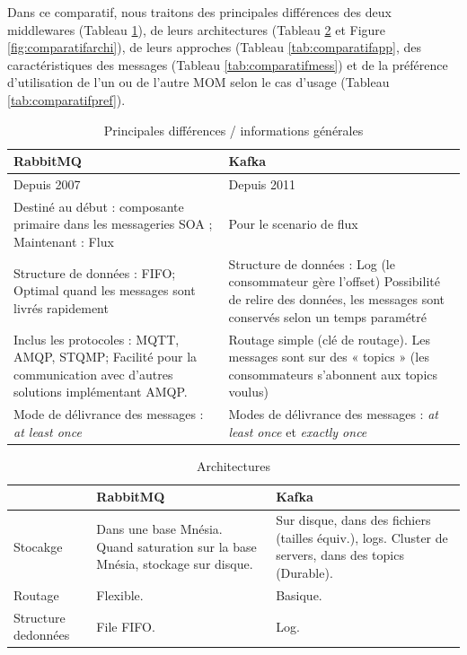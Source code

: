 \documentclass{article}
\begin{document}
			Dans ce comparatif, nous traitons des principales différences des deux middlewares (Tableau \ref{tab:comparatifinfos}), de leurs architectures (Tableau \ref{tab:comparatifarchi} et Figure \ref{fig:comparatifarchi}), de leurs approches (Tableau \ref{tab:comparatifapp}, des caractéristiques des messages (Tableau \ref{tab:comparatifmess}) et de la préférence d'utilisation de l'un ou de l'autre MOM selon le cas d'usage (Tableau \ref{tab:comparatifpref}).
			\begin{table}[p]
				\begin{tabular}{|p{7.5cm}|p{7.5cm}|}
					\hline
					\rowcolor{lightgray} RabbitMQ & Kafka\\\hline
					Depuis 2007 & Depuis 2011\\\hline
					Destiné au début : composante primaire dans les messageries SOA ; Maintenant : Flux & Pour le scenario de flux\\\hline
					Structure de données : FIFO; Optimal quand les messages sont livrés rapidement & Structure de données : Log (le consommateur gère l’offset) Possibilité de relire des données, les messages sont conservés selon un temps paramétré\\\hline
					Inclus les protocoles : MQTT, AMQP, STQMP; Facilité pour la communication avec d’autres solutions implémentant AMQP. & Routage simple (clé de routage). Les messages sont sur des « topics » (les consommateurs s’abonnent aux topics voulus)\\\hline
					Mode de délivrance des messages : \textit{at least once} & Modes de délivrance des messages : \textit{at least once} et \textit{exactly once}\\\hline
				\end{tabular}
				\caption{Principales différences / informations générales}
				\label{tab:comparatifinfos}
			\end{table}
			\medskip
			\begin{table}[p]
				\begin{tabular}{|p{3cm}|p{6cm}|p{6cm}|}
					\hline
					\rowcolor{lightgray} & RabbitMQ & Kafka\\\hline
					Stocakge & Dans une base Mnésia. Quand saturation sur la base Mnésia, stockage sur disque. & Sur disque, dans des fichiers (tailles équiv.), logs. Cluster de servers, dans des topics (Durable). \\\hline
					Routage & Flexible. & Basique.\\\hline
					Structure de\newline données & File FIFO. & Log.\\\hline
				\end{tabular}
				\caption{Architectures}
				\label{tab:comparatifarchi}
			\end{table}
\end{document}
